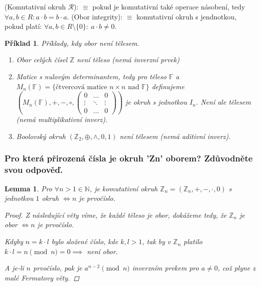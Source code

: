 \documentclass[10pt,a4paper]{article}
\newtheorem{lemma}{Lemma}
\newtheorem{priklad}{Příklad}
\newcommand{\N}{{\mathbb{N}}}       %
\newcommand{\Z}{{\mathbb{Z}}}       %
\newcommand{\F}{{\mathbb{F}}}       %
\newcommand{\RR}{{\mathcal{R}}}     %
\begin{document}
 (Komutativní okruh $\RR$): \normalfont $\equiv$ pokud je komutativní také operace násobení, tedy $\forall a,b\in R: a\cdot b = b \cdot a.$
 (Obor integrity): \normalfont $\equiv$ komutativní okruh s jendnotkou, pokud platí: $\forall a,b \in R\setminus\{0\}:~a\cdot b\neq 0.$

\begin{priklad} \normalfont Příklady, kdy obor není tělesem.
    \begin{enumerate}[label = (\roman*)]
        \item Obor celých čísel $\Z$ není těleso \textit{(nemá inverzní prvek)}
        \item Matice s nulovým determinantem, tedy pro těleso $\F$ a $M_n(\F) = \{\text{čtvercová matice $n\times n$ nad $\F$}\}$ definujeme $\left(M_n(\F), +, -, \circ, \begin{pmatrix}
            0 &\dots &0\\
            \vdots &\ddots &\vdots\\
            0 &\dots &0
        \end{pmatrix} \right)$ je okruh s jednotkou $I_n$. Není ale tělesem \textit{(nemá multiplikativní inverz)}.
        \item Boolovský okruh $(\Z_2, \oplus, \land, 0, 1)$ není tělesem \textit{(nemá aditivní inverz)}.
    \end{enumerate}
\end{priklad}

\subsubsection{Pro která přirozená čísla je okruh 'Zn' oborem? Zdůvodněte svou odpověď.}

\begin{lemma}
Pro $\forall n > 1\in \N$, je komutativní okruh $\Z_n = (\Z_n, +, -, \cdot, 0)$ s jednotkou $1$ \textit{okruh} $\iff n$ je prvočíslo.
\begin{proof}
Z následující věty víme, že každé těleso je obor, dokážeme tedy, že $\Z_n$ je obor $\iff n$ je prvočíslo.

Kdyby $n = k \cdot l$ bylo složené číslo, kde $k, l > 1$, tak by v $\Z_n$ platilo $k \cdot l = n \pmod n = 0 \implies$ není obor. 

A je-li $n$ prvočíslo, pak je $a^{n-2} \pmod n$ inverzním prvkem pro $a \neq 0$, což plyne z malé Fermatovy věty.
\end{proof}
\end{lemma}
\end{document}
